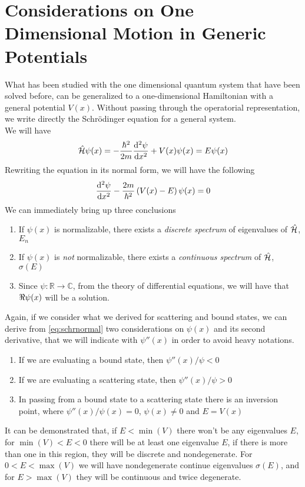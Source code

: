 \documentclass[../qm.tex]{subfiles}
\begin{document}
	\section{Considerations on One Dimensional Motion in Generic Potentials}
	What has been studied with the one dimensional quantum system that have been solved before, can be generalized to a one-dimensional Hamiltonian with a general potential $V(x)$. Without passing through the operatorial representation, we write directly the Schrödinger equation for a general system.\\
	We will have
	\begin{equation*}
		\opr{\ham}\psi(x)=-\frac{\hbar^2}{2m}\derivative[2]{\psi}{x}+V(x)\psi(x)=E\psi(x)
	\end{equation*}
	Rewriting the equation in its normal form, we will have the following
	\begin{equation}
		\derivative[2]{\psi}{x}-\frac{2m}{\hbar^2}\left( V(x)-E \right)\psi(x)=0
		\label{eq:schrnormal}
	\end{equation}
	We can immediately bring up three conclusions
	\begin{enumerate}
	\item If $\psi(x)$ is normalizable, there exists a \textit{discrete spectrum} of eigenvalues of $\hat{\mathcal{H}}$, $E_n$
	\item If $\psi(x)$ is \emph{not} normalizable, there exists a \textit{continuous spectrum} of $\hat{\mathcal{H}}$, $\sigma(E)$
	\item Since $\psi:\mathbb{R}\to\mathbb{C}$, from the theory of differential equations, we will have that $\real{\psi(x)}$ will be a solution.\\
	\end{enumerate}
	Again, if we consider what we derived for scattering and bound states, we can derive from \eqref{eq:schrnormal} two considerations on $\psi(x)$ and its second derivative, that we will indicate with $\psi''(x)$ in order to avoid heavy notations.
	\begin{enumerate}
	\item If we are evaluating a bound state, then $\psi''(x)/\psi<0$
	\item If we are evaluating a scattering state, then $\psi''(x)/\psi>0$
	\item In passing from a bound state to a scattering state there is an inversion point, where $\psi''(x)/\psi(x)=0$, $\psi(x)\ne0$ and $E=V(x)$
	\end{enumerate}
	It can be demonstrated that, if $E<\min(V)$ there won't be any eigenvalues $E$, for $\min(V)<E<0$ there will be at least one eigenvalue $E$, if there is more than one in this region, they will be discrete and nondegenerate. For $0<E<\max(V)$ we will have nondegenerate continue eigenvalues $\sigma(E)$, and for $E>\max(V)$ they will be continuous and twice degenerate.\\
\end{document}
